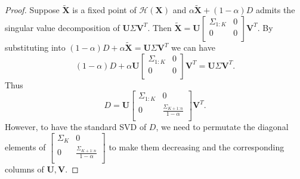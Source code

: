 \begin{proof}
Suppose $\tilde{\mathbf{X}}$ is a fixed point of $\mathcal{H}(\mathbf{X})$ and $\alpha \tilde{\mathbf{X}}+(1-\alpha)D$ admits the singular value decomposition of $\mathbf{U}\Sigma \mathbf{V}^T$. Then $\tilde{\mathbf{X}} = \mathbf{U}\left[
                                                                                               \begin{array}{cc}
                                                                                                 \Sigma_{1:K} & 0 \\
                                                                                                 0 & 0 \\
                                                                                               \end{array}
                                                                                             \right]\mathbf{V}^T$.
By substituting into $(1-\alpha)D+\alpha\tilde{\mathbf{X}} = \mathbf{U}\Sigma \mathbf{V}^T$ we can have
$$(1-\alpha)D + \alpha \mathbf{U}\left[\begin{array}{cc}
                                                                                                 \Sigma_{1:K} & 0 \\
                                                                                                 0 & 0 \\
                                                                                               \end{array}
                                                                                             \right]\mathbf{V}^T =  \mathbf{U}\Sigma \mathbf{V}^T.$$
Thus $$D = \mathbf{U}\left[\begin{array}{cc}
                                                                                                 \Sigma_{1:K} & 0 \\
                                                                                                 0 & \frac{\Sigma_{K+1:n}}{1-\alpha} \\
                                                                                               \end{array}
                                                                                             \right]\mathbf{V}^T.$$
However, to have the standard SVD of $D$, we need to permutate the diagonal elements of $\left[\begin{array}{cc}
                                                                                                 \Sigma_K & 0 \\
                                                                                                 0 & \frac{\Sigma_{K+1:n}}{1-\alpha} \\
                                                                                               \end{array}
                                                                                             \right]$ to make them decreasing and the corresponding columns of $\mathbf{U},\mathbf{V}$.


\end{proof}
